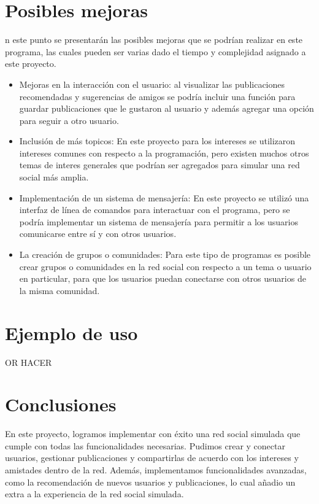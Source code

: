 \documentclass[9pt,letterpaper,onecolumn]{rho-class/rho}
\begin{document}
\newpage
\section{Posibles mejoras}

    n este punto se presentarán las posibles mejoras que se podrían realizar en este programa, las cuales pueden ser varias dado el tiempo y complejidad asignado a este proyecto.

    \begin{itemize}
        \item Mejoras en la interacción con el usuario: al visualizar las publicaciones recomendadas y sugerencias de amigos se podría incluir una función para guardar publicaciones que le gustaron al usuario y además agregar una opción para seguir a otro usuario.
        \vspace{0.3cm}
        \item Inclusión de más topicos: En este proyecto para los intereses se utilizaron intereses comunes con respecto a la programación, pero existen muchos otros temas de interes generales que podrían ser agregados para simular una red social más amplia.
        \vspace{0.3cm}
        \item Implementación de un sistema de mensajería: En este proyecto se utilizó una interfaz de línea de comandos para interactuar con el programa, pero se podría implementar un sistema de mensajería para permitir a los usuarios comunicarse entre sí y con otros usuarios.
        \vspace{0.3cm}
        \item La creación de grupos o comunidades: Para este tipo de programas es posible crear grupos o comunidades en la red social con respecto a un tema o usuario en particular, para que los usuarios puedan conectarse con otros usuarios de la misma comunidad.
    \end{itemize}

\newpage
\section{Ejemplo de uso}

    OR HACER

\newpage
\section{Conclusiones}

    En este proyecto, logramos implementar con éxito una red social simulada que cumple con todas las funcionalidades necesarias. Pudimos crear y conectar usuarios, gestionar publicaciones y compartirlas de acuerdo con los intereses y amistades dentro de la red. Además, implementamos funcionalidades avanzadas, como la recomendación de nuevos usuarios y publicaciones, lo cual añadio un extra a la experiencia de la red social simulada.
\end{document}
